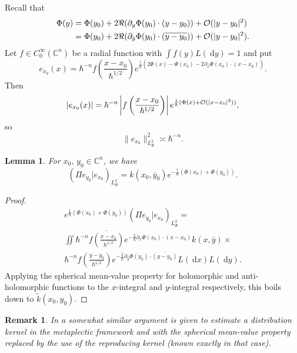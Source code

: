 \documentclass{article}
\newtheorem{lemm}[theo]{Lemma}
\newtheorem{remark}[theo]{Remark}
\newcommand{\DD}{\:\!\mathrm{d}}
\newcommand{\CM}{\mathbb{C}}
\newcommand{\h}{\hbar}
\newcommand{\pscal}[2]{\left(#1 | #2\right)}
\begin{document}
\par Recall that
\begin{equation}\label{bcn.10}
  \begin{split}
    \Phi (y)&=\Phi (y_0)+2\Re (\partial _y\Phi (y_0)\cdot
    (y-y_0))+{\cal
      O}(|y-y_0|^2)\\
    &=\Phi (y_0)+2\Re (\partial _{\bar{y}}\Phi (y_0)\cdot
    (\overline{y-y_0}))+{\cal O}(|y-y_0|^2).
  \end{split}
\end{equation}
Let $f\in C_0^\infty (\CM^n)$ be a radial function with
$\int f(y)L(\DD y)=1$ and put
\begin{equation}\label{bcn.11}
  e_{x_0}(x)=\h^{-n}f\left(\frac{x-x_0}{\h^{1/2}} \right)
  e^{\frac{1}{\h}(2\Phi (x)-\Phi (x_0)-2\partial _{\bar{x}}\Phi
    (x_0)\cdot \overline{(x-x_0)})}.
\end{equation}
Then
\[
|e_{x_0}(x)|=\h^{-n}\left| f\left(\frac{x-x_0}{\h^{1/2}} \right)
\right| e^{\frac{1}{\h}(\Phi (x)+{\cal O}(|x-x_0|^2))},
\]
so
\begin{equation}\label{bcn.12}
  \| e_{x_0}\|^2_{L^2_\Phi }\asymp \h^{-n}.
\end{equation}
\begin{lemm}
  \label{bcn3}
  For $x_0,\, y_0\in \CM^n$, we have
  \begin{equation}\label{bcn.13}
    \pscal{\Pi e_{y_0}}{e_{x_0}}_{L^2_\Phi }= k(x_0,\bar{y}_0)e^{-\frac{1}{\h}(\Phi
      (x_0)+\Phi (y_0))}.
  \end{equation}
\end{lemm}
\begin{proof}
  \begin{multline}
    e^{\frac{1}{\h}(\Phi (x_0)+\Phi (y_0))}\pscal{\Pi e_{y_0}}{e_{x_0}} _{L^2_\Phi }=\\
    \iint \h^{-n}\overline{f\left(\frac{x-x_0}{\h^{1/2}}
      \right)}e^{-\frac{2}{\h}\partial _x\Phi (x_0)\cdot
      (x-x_0)} k(x,\bar{y})\times \\
    \h^{-n}f\left(\frac{y-y_0}{\h^{1/2}}
    \right)e^{-\frac{2}{\h}\partial _{\bar{y}}\Phi (y_0)\cdot
      \overline{(y-y_0) }} L(\DD x)L(\DD y).
  \end{multline}
  Applying the spherical mean-value property for holomorphic and
  anti-holo\-morphic functions to the $x$-integral and $y$-integral
  respectively, this boils down to $\widetilde{k}(x_0,y_0)$.
\end{proof}
\begin{remark}
  In \cite[Section 3]{co-hi-sjo-18} a somewhat similar argument is
  given to estimate a distribution kernel in the metaplectic framework
  and with the spherical mean-value property replaced by the use of
  the reproducing kernel (known exactly in that case).
\end{remark}
\end{document}
